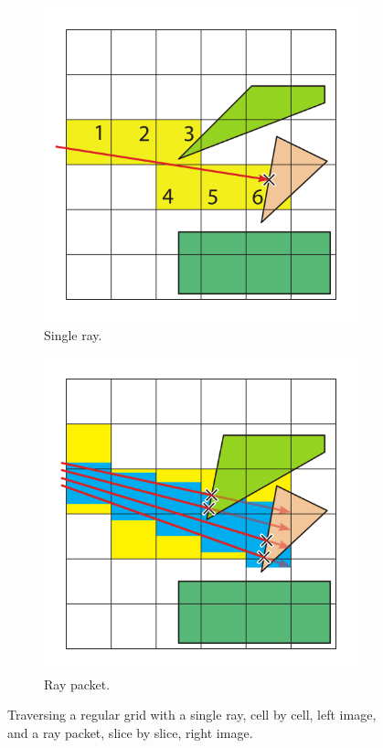 \begin{figure}
	\centering
	\begin{subfigure}[t]{0.44\textwidth}
		\centering
		\includegraphics[width=\textwidth]{images/cell_traverser}
		\caption{Single ray.}
		\label{fig:cell_traverser}
	\end{subfigure}
	\begin{subfigure}[t]{0.44\textwidth}
		\centering
		\includegraphics[width=\textwidth]{images/slice_traverser}
		\caption{Ray packet.}
		\label{fig:slice_traverser}
	\end{subfigure}
	\caption[Single ray and ray packet traverser]{
		Traversing a regular grid with a single ray, cell by cell, left image, and a ray packet, slice by slice, right image.
	}
	\label{fig:traverser}
\end{figure}

